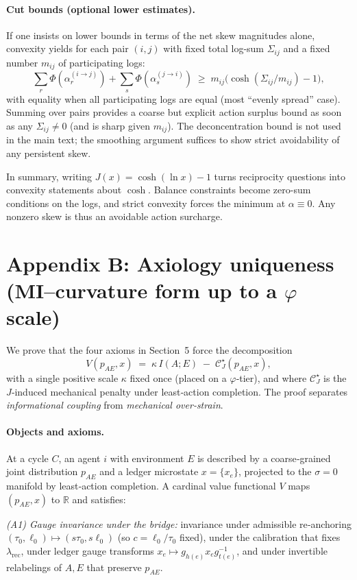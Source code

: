 \documentclass[11pt]{article}
\begin{document}
\paragraph{Cut bounds (optional lower estimates).}
If one insists on lower bounds in terms of the net skew magnitudes alone, convexity yields for each pair $(i,j)$ with fixed total log-sum $\Sigma_{ij}$ and a fixed number $m_{ij}$ of participating logs:
\[
\sum_{r}\Phi(\alpha^{(i\to j)}_r)+\sum_{s}\Phi(\alpha^{(j\to i)}_s)
\;\ge\; m_{ij}\big(\cosh(\Sigma_{ij}/m_{ij})-1\big),
\]
with equality when all participating logs are equal (most “evenly spread” case). Summing over pairs provides a coarse but explicit action surplus bound as soon as any $\Sigma_{ij}\neq 0$ (and is sharp given $m_{ij}$). The deconcentration bound is not used in the main text; the smoothing argument suffices to show strict avoidability of any persistent skew.

\medskip
In summary, writing $J(x)=\cosh(\ln x)-1$ turns reciprocity questions into convexity statements about $\cosh$. Balance constraints become zero-sum conditions on the logs, and strict convexity forces the minimum at $\alpha\equiv 0$. Any nonzero skew is thus an avoidable action surcharge.

\section{Appendix B: Axiology uniqueness (MI–curvature form up to a $\varphi$ scale)}

We prove that the four axioms in Section~5 force the decomposition
\[
V(p_{AE},x)\;=\;\kappa\, I(A;E)\;-\;\mathcal{C}_J^\star(p_{AE},x),
\]
with a single positive scale $\kappa$ fixed once (placed on a $\varphi$‑tier), and where $\mathcal{C}_J^\star$ is the $J$‑induced mechanical penalty under least‑action completion. The proof separates \emph{informational coupling} from \emph{mechanical over‑strain}.

\paragraph{Objects and axioms.}
At a cycle $C$, an agent $i$ with environment $E$ is described by a coarse‑grained joint distribution $p_{AE}$ and a ledger microstate $x=\{x_e\}$, projected to the $\sigma=0$ manifold by least‑action completion. A cardinal value functional $V$ maps $(p_{AE},x)$ to $\mathbb{R}$ and satisfies:

\emph{(A1) Gauge invariance under the bridge:} invariance under admissible re‑anchoring $(\tau_0,\ell_0)\mapsto(s\tau_0,s\ell_0)$ (so $c=\ell_0/\tau_0$ fixed), under the calibration that fixes $\lambda_{\mathrm{rec}}$, under ledger gauge transforms $x_e\mapsto g_{h(e)}x_eg^{-1}_{t(e)}$, and under invertible relabelings of $A,E$ that preserve $p_{AE}$.
\end{document}
